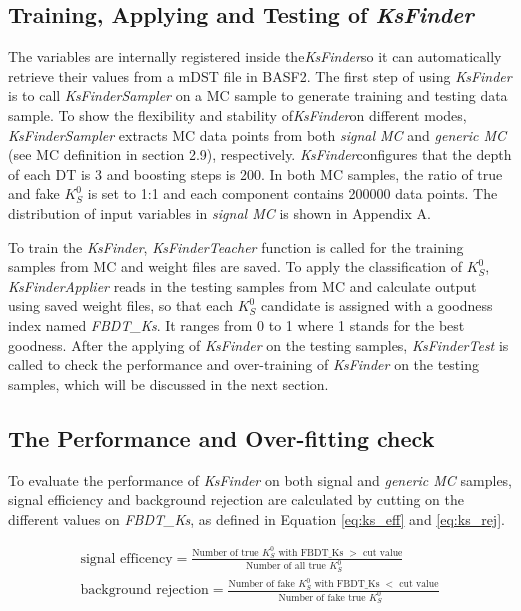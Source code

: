 \subsection{Training, Applying and Testing of \textit{KsFinder}}
The variables are internally registered inside the\textit{KsFinder}so it can automatically retrieve their values from a mDST file in BASF2. The first step of using \textit{KsFinder} is to call \textit{KsFinderSampler} on a MC sample to generate training and testing data sample. To show the flexibility and stability of\textit{KsFinder}on different modes, \textit{KsFinderSampler} extracts MC data points from both \textit{signal MC} and \textit{generic MC} (see MC definition in section 2.9), respectively. \textit{KsFinder}configures that the depth of each DT is 3 and boosting steps is 200. In both MC samples, the ratio of true and fake $K_S^0$ is set to 1:1 and each component contains 200000 data points. The distribution of input variables in \textit{signal MC} is shown in Appendix A. 

To train the \textit{KsFinder}, \textit{KsFinderTeacher} function is called for the training samples from MC and weight files are saved. To apply the classification of $K_S^0$, \textit{KsFinderApplier} reads in the testing samples from MC and calculate output using saved weight files, so that each $K_S^0$ candidate is assigned with a goodness index named \textit{FBDT\_Ks}. It ranges from 0 to 1 where 1 stands for the best goodness. After the applying of \textit{KsFinder} on the testing samples, \textit{KsFinderTest} is called to check the performance and over-training of \textit{KsFinder} on the testing samples, which will be discussed in the next section. 

\subsection{The Performance and Over-fitting check}
To evaluate the performance of \textit{KsFinder} on both signal and \textit{generic MC} samples, signal efficiency and background rejection are calculated by cutting on the different values on \textit{FBDT\_Ks}, as defined in Equation \ref{eq:ks_eff} and \ref{eq:ks_rej}.

\begin{eqnarray}
	\text{signal efficency} = \frac{\text{Number of true $K_S^0$ with FBDT\_Ks $>$ cut value}}{\text{Number of all true $K_S^0$ }} \label{eq:ks_eff}\\
	\text{background rejection} = \frac{\text{Number of fake $K_S^0$ with FBDT\_Ks $<$ cut value}}{\text{Number of fake true $K_S^0$ }} \label{eq:ks_rej}
\end{eqnarray}

